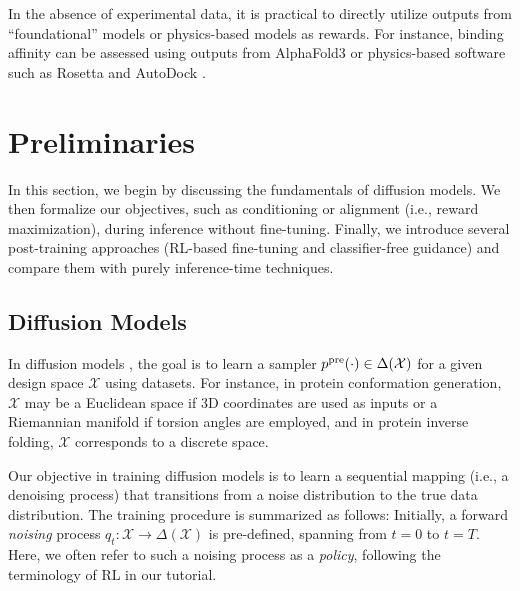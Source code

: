 \documentclass[12pt]{article} %
\begin{document}
{{In the absence of experimental data, it is practical to directly utilize outputs from ``foundational'' models or physics-based models as rewards. For instance, binding affinity can be assessed using outputs from AlphaFold3 \citep{abramson2024accurate} or physics-based software such as Rosetta and AutoDock \citep{chaudhury2010pyrosetta,trott2010autodock}.
} 











\tableofcontents



\section{Preliminaries} 

In this section, we begin by discussing the fundamentals of diffusion models. We then formalize our objectives, such as conditioning or alignment (i.e., reward maximization), during inference without fine-tuning. Finally, we introduce several post-training approaches (RL-based fine-tuning and classifier-free guidance) and compare them with purely inference-time techniques.

\subsection{Diffusion Models} 

In diffusion models \citep{sohl2015deep, ho2020denoising, song2020denoising}, the goal is to learn a sampler $p^{\mathrm{pre}}(\cdot) \in \Delta(\mathcal{X})$ for a given design space $\mathcal{X}$ using datasets. For instance, in protein conformation generation, $\mathcal{X}$ may be a Euclidean space if 3D coordinates are used as inputs or a Riemannian manifold if torsion angles are employed, and in protein inverse folding, $\mathcal{X}$ corresponds to a discrete space.


Our objective in training diffusion models is to learn a sequential mapping (i.e., a denoising process) that transitions from a noise distribution to the true data distribution. The training procedure is summarized as follows: Initially, a forward \emph{noising} process $q_t: \mathcal{X} \to \Delta(\mathcal{X})$ is pre-defined, spanning from $t = 0$ to $t = T$. Here, we often refer to such a noising process as a \emph{policy}, following the terminology of RL in our tutorial.

}
\end{document}
